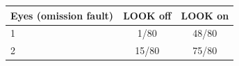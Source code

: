 \begin{tabular}{lcc}
\toprule
Eyes (omission fault) & LOOK off & LOOK on \\
\midrule
1 & 1/80 & 48/80 \\
2 & 15/80 & 75/80 \\
\bottomrule
\end{tabular}
